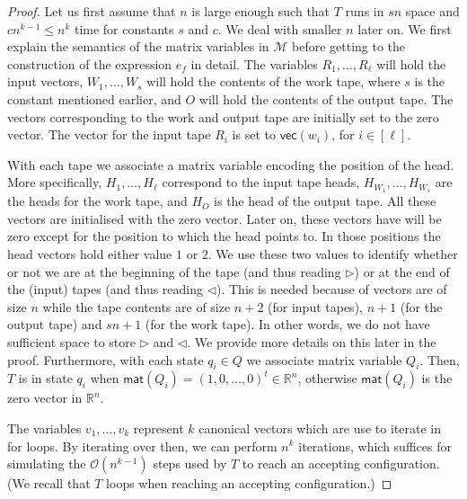 \begin{proof}
Let us first assume that $n$ is large enough such that $T$ runs in $sn$ space and $cn^{k-1}\leq n^k$ time for constants $s$ and $c$. We deal with smaller $n$ later on.	
We  first explain the semantics of the matrix variables in $\mathcal{M}$ before getting to the construction of the expression $e_f$ in detail.  The variables $R_1,\ldots,R_\ell$ will hold the input vectors, $W_1,\ldots,W_s$ will hold the contents of the work
tape, where $s$ is the constant mentioned earlier, and $O$ will hold the contents of the output tape. The vectors corresponding to the work and output tape are initially set to the zero vector. The vector for the input tape $R_i$ is set to $\mathsf{vec}(w_i)$, for $i\in[\ell]$.

 With each tape we associate a matrix variable encoding the position of the head. More specifically, $H_1,\ldots,H_\ell$ correspond to the input tape heads,
$H_{W_1},\ldots, H_{W_s}$ are the heads for the work tape, and $H_O$ is the head of the output tape. All these vectors are initialised with the zero vector. Later on, these vectors have will be zero except for the position to which the head points to. In those positions the head vectors hold either value $1$ or $2$. We use these two values to identify whether or not we are at the beginning of the tape (and thus reading $\rhd$)
or at the end of the (input) tapes (and thus reading $\lhd$). This is needed because of vectors are of size $n$ while the tape contents are of size $n+2$ (for input tapes), $n+1$ (for the output tape) and $sn+1$ (for the work tape). In other words, we do not have sufficient space to store $\rhd$ and $\lhd$. We provide more details on this later in the proof.
%
Furthermore, with each state $q_i\in Q$ we associate matrix variable $Q_i$.
Then, $T$ is in state $q_i$ when
 $\mathsf{mat}(Q_i)=(1,0,\ldots,0)^t\in\mathbb{R}^n$, otherwise $\mathsf{mat}(Q_i)$ is the zero vector in $\mathbb{R}^n$.	

The variables $v_1,\ldots,v_{k}$ represent $k$ canonical vectors  which are use to iterate in for loops. By iterating over then, we can perform $n^{k}$ iterations, which suffices for simulating the $\mathcal{O}(n^{k-1})$ steps used by $T$ to reach an accepting configuration. (We recall that $T$ loops when reaching an accepting configuration.)



\end{proof}
